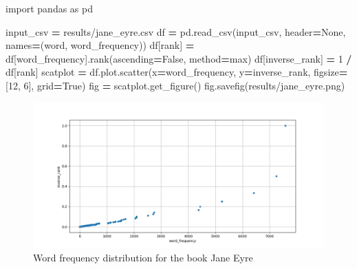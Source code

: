 \documentclass[
]{krantz}
\makeatletter
\newenvironment{Shaded}{\begin{snugshade}}{\end{snugshade}}
\newcommand{\DecValTok}[1]{\textcolor[rgb]{0.00,0.00,0.81}{#1}}
\newcommand{\ImportTok}[1]{#1}
\newcommand{\NormalTok}[1]{#1}
\newcommand{\OperatorTok}[1]{\textcolor[rgb]{0.81,0.36,0.00}{\textbf{#1}}}
\newcommand{\StringTok}[1]{\textcolor[rgb]{0.31,0.60,0.02}{#1}}
\newcommand{\VariableTok}[1]{\textcolor[rgb]{0.00,0.00,0.00}{#1}}
\newenvironment{kframe}{%
\medskip{}
\setlength{\fboxsep}{.8em}
 \def\at@end@of@kframe{}%
 \ifinner\ifhmode%
  \def\at@end@of@kframe{\end{minipage}}%
  \begin{minipage}{\columnwidth}%
 \fi\fi%
 \def\FrameCommand##1{\hskip\@totalleftmargin \hskip-\fboxsep
 \colorbox{shadecolor}{##1}\hskip-\fboxsep
     \hskip-\linewidth \hskip-\@totalleftmargin \hskip\columnwidth}%
 \MakeFramed {\advance\hsize-\width
   \@totalleftmargin\z@ \linewidth\hsize
   \@setminipage}}%
 {\par\unskip\endMakeFramed%
 \at@end@of@kframe}
\renewenvironment{Shaded}{\begin{kframe}}{\end{kframe}}
\makeatother
\begin{document}
\begin{Shaded}
\begin{Highlighting}[]
\ImportTok{import}\NormalTok{ pandas }\ImportTok{as}\NormalTok{ pd}


\NormalTok{input\_csv }\OperatorTok{=} \StringTok{\textquotesingle{}results/jane\_eyre.csv\textquotesingle{}}
\NormalTok{df }\OperatorTok{=}\NormalTok{ pd.read\_csv(input\_csv, header}\OperatorTok{=}\VariableTok{None}\NormalTok{, names}\OperatorTok{=}\NormalTok{(}\StringTok{\textquotesingle{}word\textquotesingle{}}\NormalTok{, }\StringTok{\textquotesingle{}word\_frequency\textquotesingle{}}\NormalTok{))}
\NormalTok{df[}\StringTok{\textquotesingle{}rank\textquotesingle{}}\NormalTok{] }\OperatorTok{=}\NormalTok{ df[}\StringTok{\textquotesingle{}word\_frequency\textquotesingle{}}\NormalTok{].rank(ascending}\OperatorTok{=}\VariableTok{False}\NormalTok{, method}\OperatorTok{=}\StringTok{\textquotesingle{}max\textquotesingle{}}\NormalTok{)}
\NormalTok{df[}\StringTok{\textquotesingle{}inverse\_rank\textquotesingle{}}\NormalTok{] }\OperatorTok{=} \DecValTok{1} \OperatorTok{/}\NormalTok{ df[}\StringTok{\textquotesingle{}rank\textquotesingle{}}\NormalTok{]}
\NormalTok{scatplot }\OperatorTok{=}\NormalTok{ df.plot.scatter(x}\OperatorTok{=}\StringTok{\textquotesingle{}word\_frequency\textquotesingle{}}\NormalTok{, y}\OperatorTok{=}\StringTok{\textquotesingle{}inverse\_rank\textquotesingle{}}\NormalTok{,}
\NormalTok{                           figsize}\OperatorTok{=}\NormalTok{[}\DecValTok{12}\NormalTok{, }\DecValTok{6}\NormalTok{], grid}\OperatorTok{=}\VariableTok{True}\NormalTok{)}
\NormalTok{fig }\OperatorTok{=}\NormalTok{ scatplot.get\_figure()}
\NormalTok{fig.savefig(}\StringTok{\textquotesingle{}results/jane\_eyre.png\textquotesingle{}}\NormalTok{)}
\end{Highlighting}
\end{Shaded}

\begin{figure}

{\centering \includegraphics[width=1\linewidth]{figures/scripting/jane-eyre} 

}

\caption{Word frequency distribution for the book Jane Eyre}\label{fig:scripting-repl}
\end{figure}
\end{document}
